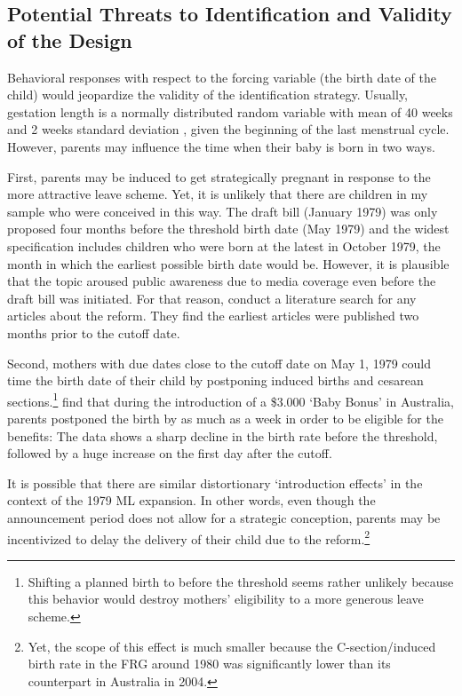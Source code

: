 \documentclass[11pt, a4paper, draft]{article} %
\begin{document}
\bigskip
\subsection{Potential Threats to Identification and Validity of the Design}\label{sec:empirical_strategy_threats+validity}
Behavioral responses with respect to the forcing variable (the birth date of the child) would jeopardize the validity of the identification strategy. Usually, gestation length is a normally distributed random variable with mean of 40 weeks and 2 weeks standard deviation \citep{Ekberg2013parental}, given the beginning of the last menstrual cycle. However, parents may influence the time when their baby is born in two ways. 

First, parents may be induced to get strategically pregnant in response to the more attractive leave scheme. Yet, it is unlikely that there are children in my sample who were conceived in this way. The draft bill (January 1979) was only proposed four months before the threshold birth date (May 1979) and the widest specification includes children who were born at the latest in October 1979, the month in which the earliest possible birth date would be. However, it is plausible that the topic aroused public awareness due to media coverage even before the draft bill was initiated. For that reason, \cite{Dustmann2012} conduct a literature search for any articles about the reform. They find the earliest articles were published two months prior to the cutoff date.

Second, mothers with due dates close to the cutoff date on May 1, 1979 could time the birth date of their child by postponing induced births and cesarean sections.\footnote{Shifting a planned birth to before the threshold seems rather unlikely because this behavior would destroy mothers' eligibility to a more generous leave scheme.} \cite{gans2009born} find that during the introduction of a \$3.000 `Baby Bonus' in Australia, parents postponed the birth by as much as a week in order to be eligible for the benefits: The data shows a sharp decline in the birth rate before the threshold, followed by a huge increase on the first day after the cutoff.

It is possible that there are similar distortionary `introduction effects' in the context of the 1979 ML expansion. In other words, even though the announcement period does not allow for a strategic conception, parents may be incentivized to delay the delivery of their child due to the reform.\footnote{Yet, the scope of this effect is much smaller because the C-section/induced birth rate in the FRG around 1980 was significantly lower than its counterpart in Australia in 2004.} %
\end{document}
